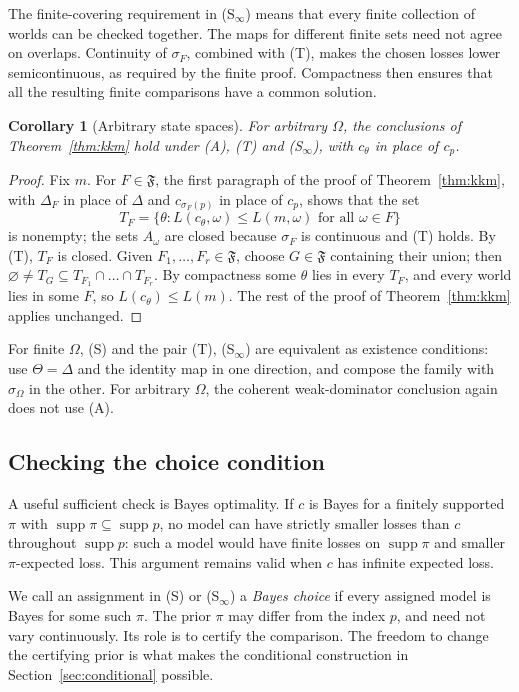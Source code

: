 \documentclass[11pt]{article}
\newtheorem{corollary}[theorem]{Corollary}
\theoremstyle{definition}
\theoremstyle{remark}
\newcommand{\F}{\mathfrak F}
\newcommand{\supp}{\operatorname{supp}}
\begin{document}
The finite-covering requirement in (S$_\infty$) means that every finite collection of worlds can be checked together. The maps for different finite sets need not agree on overlaps. Continuity of $\sigma_F$, combined with (T), makes the chosen losses lower semicontinuous, as required by the finite proof. Compactness then ensures that all the resulting finite comparisons have a common solution.
\begin{corollary}[Arbitrary state spaces]\label{cor:infinite}
For arbitrary $\Omega$, the conclusions of Theorem~\ref{thm:kkm} hold under (A), (T) and (S$_\infty$), with $c_\theta$ in place of $c_p$.
\end{corollary}
\begin{proof}
Fix $m$. For $F\in\F$, the first paragraph of the proof of Theorem~\ref{thm:kkm}, with $\Delta_F$ in place of $\Delta$ and $c_{\sigma_F(p)}$ in place of $c_p$, shows that the set
\[
 T_F=\{\theta:L(c_\theta,\omega)\le L(m,\omega)\text{ for all }\omega\in F\}
\]
is nonempty; the sets $A_\omega$ are closed because $\sigma_F$ is continuous and (T) holds. By (T), $T_F$ is closed. Given $F_1,\dots,F_r\in\F$, choose $G\in\F$ containing their union; then $\varnothing\ne T_G\subseteq T_{F_1}\cap\dots\cap T_{F_r}$. By compactness some $\theta$ lies in every $T_F$, and every world lies in some $F$, so $L(c_\theta)\le L(m)$. The rest of the proof of Theorem~\ref{thm:kkm} applies unchanged.
\end{proof}

For finite $\Omega$, (S) and the pair (T), (S$_\infty$) are equivalent as existence conditions: use $\Theta=\Delta$ and the identity map in one direction, and compose the family with $\sigma_\Omega$ in the other. For arbitrary $\Omega$, the coherent weak-dominator conclusion again does not use (A).

\subsection{Checking the choice condition}\label{rem:bayes-S}
A useful sufficient check is Bayes optimality. If $c$ is Bayes for a finitely supported $\pi$ with $\supp\pi\subseteq\supp p$, no model can have strictly smaller losses than $c$ throughout $\supp p$: such a model would have finite losses on $\supp\pi$ and smaller $\pi$-expected loss. This argument remains valid when $c$ has infinite expected loss.

We call an assignment in (S) or (S$_\infty$) a \emph{Bayes choice} if every assigned model is Bayes for some such $\pi$. The prior $\pi$ may differ from the index $p$, and need not vary continuously. Its role is to certify the comparison. The freedom to change the certifying prior is what makes the conditional construction in Section~\ref{sec:conditional} possible.
\end{document}
